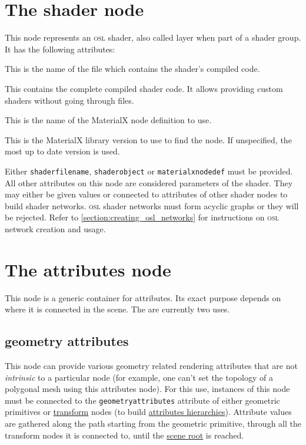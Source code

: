 \documentclass[oneside,ebook]{memoir}
\newcommand*{\acronym}[1]{\textsc{\lowercase{#1}}}
\newcommand{\paramlistitemTN}[2]{\item[#2\textcolor{lightgray}{\dotfill}#1]}
\begin{document}
\section{The shader node}
\label{section:shadernode}
This node represents an \acronym{OSL} shader, also called layer when part of a shader group. It has the following attributes:
\begin{paramlist}
\paramlistitemTN{string}{shaderfilename}
This is the name of the file which contains the shader's compiled code.
\paramlistitemTN{string}{shaderobject}
This contains the complete compiled shader code. It allows providing custom shaders without going through files.
\paramlistitemTN{string}{materialxnodedef}
This is the name of the MaterialX node definition to use.
\paramlistitemTN{string}{materialxversion}
This is the MaterialX library version to use to find the node.
If unspecified, the most up to date version is used.
\end{paramlist}
Either \lstinline|shaderfilename|, \lstinline|shaderobject| or \lstinline|materialxnodedef| must be provided.
All other attributes on this node are considered parameters of the shader.
They may either be given values or connected to attributes of other shader nodes to build shader networks.
\acronym{OSL} shader networks must form acyclic graphs or they will be rejected. Refer to \autoref{section:creating_osl_networks} for instructions on \acronym{OSL} network creation and usage.

\section{The attributes node}
\label{section:attributesnode}
This node is a generic container for attributes. Its exact purpose depends on where it is connected in the scene. The are currently two uses.
\subsection{geometry attributes}
This node can provide various geometry related rendering attributes that are not \emph{intrinsic} to a particular node (for example, one can't set the topology of a polygonal mesh using this attributes node).
For this use, instances of this node must be connected to the \lstinline|geometryattributes| attribute of either geometric primitives or \hyperref[section:transform]{transform} nodes (to build \hyperref[section:primvars]{attributes hierarchies}).
Attribute values are gathered along the path starting from the geometric primitive, through all the transform nodes it is connected to, until the \hyperref[section:rootnode]{scene root} is reached.
\end{document}
